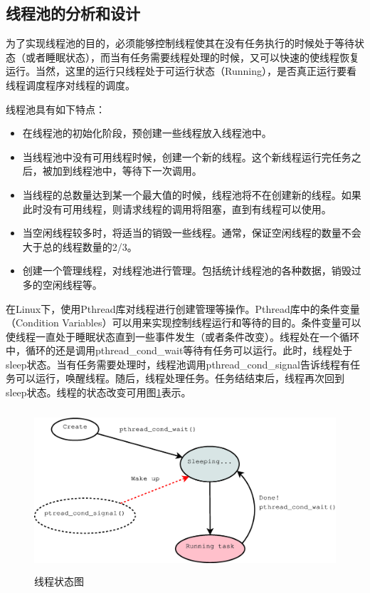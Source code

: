 \documentclass[twoside, xetex]{report}
\begin{document}
\subsection{线程池的分析和设计}
	为了实现线程池的目的，必须能够控制线程使其在没有任务执行的时候处于等待状态（或者睡眠状态），而当有任务需要线程处理的时候，又可以快速的使线程恢复运行。当然，这里的运行只线程处于可运行状态（Running），是否真正运行要看线程调度程序对线程的调度。
	
	线程池具有如下特点：
	\begin{itemize}
		\item 在线程池的初始化阶段，预创建一些线程放入线程池中。
		\item 当线程池中没有可用线程时候，创建一个新的线程。这个新线程运行完任务之后，被加到线程池中，等待下一次调用。
		\item 当线程的总数量达到某一个最大值的时候，线程池将不在创建新的线程。如果此时没有可用线程，则请求线程的调用将阻塞，直到有线程可以使用。
		\item 当空闲线程较多时，将适当的销毁一些线程。通常，保证空闲线程的数量不会大于总的线程数量的2/3。
		\item 创建一个管理线程，对线程池进行管理。包括统计线程池的各种数据，销毁过多的空闲线程等。
	\end{itemize}
	
	在Linux下，使用Pthread库对线程进行创建管理等操作。Pthread库中的条件变量（Condition Variables）可以用来实现控制线程运行和等待的目的。条件变量可以使线程一直处于睡眠状态直到一些事件发生（或者条件改变）。线程处在一个循环中，循环的还是调用pthread\_cond\_wait等待有任务可以运行。此时，线程处于sleep状态。当有任务需要处理时，线程池调用pthread\_cond\_signal告诉线程有任务可以运行，唤醒线程。随后，线程处理任务。任务结结束后，线程再次回到sleep状态。线程的状态改变可用图\ref{tpthread}表示。
	
	\begin{figure}[htbp]
	\centering
	\includegraphics[height=6cm, width=13cm]{pics/tpthread.eps}
	\caption{线程状态图}
	\label{tpthread}
	\end{figure}
	
\end{document}
